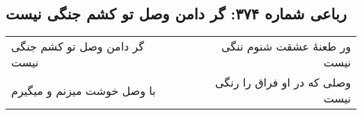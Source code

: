 \begin{center}
\section*{رباعی شماره ۳۷۴: گر دامن وصل تو کشم جنگی نیست}
\label{sec:0374}
\begin{longtable}{l p{0.5cm} r}
گر دامن وصل تو کشم جنگی نیست
&&
ور طعنهٔ عشقت شنوم ننگی نیست
\\
با وصل خوشت میزنم و میگیرم
&&
وصلی که در او فراق را رنگی نیست
\\
\end{longtable}
\end{center}
